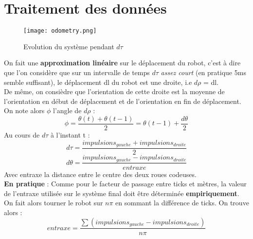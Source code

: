     \section{Traitement des données}
        \begin{figure}[h]
            \begin{center}
                \texttt{[image: odometry.png]}
            \end{center}

            \caption{Evolution du système pendant $d\tau$}
        \end{figure}
        On fait une \textbf{approximation linéaire} sur le déplacement du robot, c’est à dire que l’on considère que sur un intervalle de temps $d\tau$ \textit{assez court} (en pratique 5ms semble suffisant), le déplacement dl du robot est une droite, i.e $d\rho$ = dl.\\
        De même, on consièdre que l’orientation de cette droite est la moyenne de l’orientation en début de déplacement et de l’orientation en fin de déplacement. On note alors $\phi$ l’angle de $d\rho$ :
        $$
            \phi = \frac{\theta(t) + \theta(t-1)}{2} = \theta(t-1)+ \frac{d\theta}{2}
        $$
        Au cours de $d\tau$ à l’instant t :
        \begin{equation}
            d\tau = \frac{impulsions_{gauche} + impulsions_{droite}}{2}
            \label{dTAU}
        \end{equation}
        \begin{equation}
            d\theta = \frac{impulsions_{gauche} - impulsions_{droite}}{entraxe}
            \label{dTHETA}
        \end{equation}
        Avec entraxe la distance entre le centre des deux roues codeuses.\\

        \textbf{En pratique} : Comme pour le facteur de passage entre ticks et mètres, la valeur de l’entraxe utilisée sur le système final doit être déterminée \textbf{empiriquement}. On fait alors tourner le robot sur $n\pi$ en sommant la différence de ticks. On trouve alors :
        \begin{equation}
            entraxe = \frac{\sum(impulsions_{gauche} - impulsions_{droite})}{n\pi}
        \end{equation}

